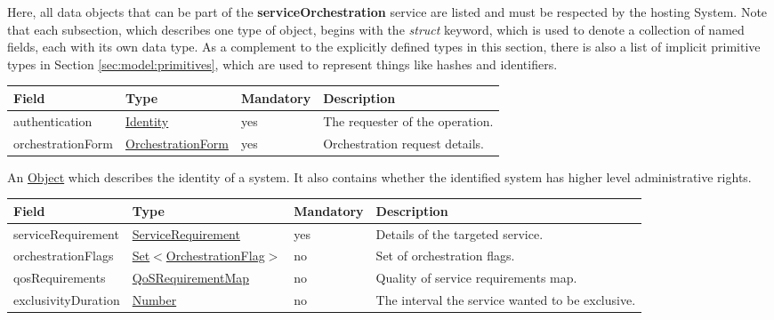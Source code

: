 \documentclass[a4paper]{arrowhead}
\newcommand{\pref}[1]{{\textcolor{ArrowheadGrey}{\hyperref[sec:model:primitives:#1]{#1}}}}
\begin{document}
Here, all data objects that can be part of the \textbf{serviceOrchestration} service are listed and must be respected by the hosting System.
Note that each subsection, which describes one type of object, begins with the \textit{struct} keyword, which is used to denote a collection of named fields, each with its own data type.
As a complement to the explicitly defined types in this section, there is also a list of implicit primitive types in Section \ref{sec:model:primitives}, which are used to represent things like hashes and identifiers.

{}
 
\begin{table}[ht!]
\begin{tabularx}{\textwidth}{| p{3.25cm} | p{3.5cm} | p{2cm} | X |} \hline
\rowcolor{gray!33} Field & Type & Mandatory & Description \\ \hline
authentication & \hyperref[sec:model:Identity]{Identity} & yes & The requester of the operation. \\ \hline
orchestrationForm & \hyperref[sec:model:OrchestrationForm]{OrchestrationForm} & yes & Orchestration request details. \\ \hline
\end{tabularx}
\end{table}


An \pref{Object} which describes the identity of a system. It also contains whether the identified system has higher level administrative rights.


\begin{table}[ht!]
\begin{tabularx}{\textwidth}{| p{3.25cm} | p{3.8cm} | p{2cm} | X |} \hline
\rowcolor{gray!33} Field & Type & Mandatory & Description \\ \hline
serviceRequirement & \hyperref[sec:model:ServiceRequirement]{ServiceRequirement} & yes & Details of the targeted service. \\ \hline
orchestrationFlags & \pref{Set}$<$\hyperref[sec:model:OrchestrationFlag]{OrchestrationFlag}$>$ & no & Set of orchestration flags. \\ \hline
qosRequirements & \hyperref[sec:model:QoSRequirementMap]{QoSRequirementMap} & no & Quality of service requirements map. \\ \hline
exclusivityDuration & \pref{Number} & no & The interval the service wanted to be exclusive.  \\ \hline
\end{tabularx}
\end{table}
\end{document}

